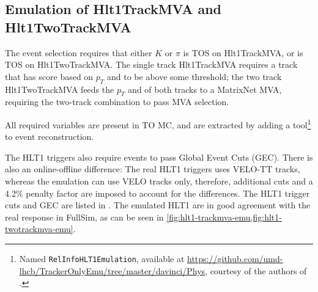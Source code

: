\subsection{Emulation of Hlt1TrackMVA and Hlt1TwoTrackMVA}

The event selection requires that either $K$ or $\pi$ is TOS on Hlt1TrackMVA,
or \Dz is TOS on Hlt1TwoTrackMVA.
The single track Hlt1TrackMVA requires a track that has score based on
$p_T$ and \ipChiSq to be above some threshold;
the two track Hlt1TwoTrackMVA feeds the $p_T$ and \ipChiSq of both tracks to
a MatrixNet MVA, requiring the two-track combination to pass MVA selection.

All required variables are present in TO MC, and are extracted by adding
a tool\footnote{
    Named \lstinline{RelInfoHLT1Emulation}, available at
    \url{https://github.com/umd-lhcb/TrackerOnlyEmu/tree/master/davinci/Phys},
    courtesy of the authors of \cite{LHCb-INT-2019-025}.
} to event reconstruction.

The HLT1 triggers also require events to pass Global Event Cuts (GEC).
There is also an online-offline difference:
The real HLT1 triggers uses VELO-TT tracks, whereas the emulation can use
VELO tracks only, therefore, additional cuts and a 4.2\% penalty factor are
imposed to account for the differences.
The HLT1 trigger cuts and GEC are listed in \cite{LHCb-INT-2019-025}.
The emulated HLT1 are in good agreement with the real response in FullSim, as
can be seen in \cref{fig:hlt1-trackmva-emu,fig:hlt1-twotrackmva-emu}.

